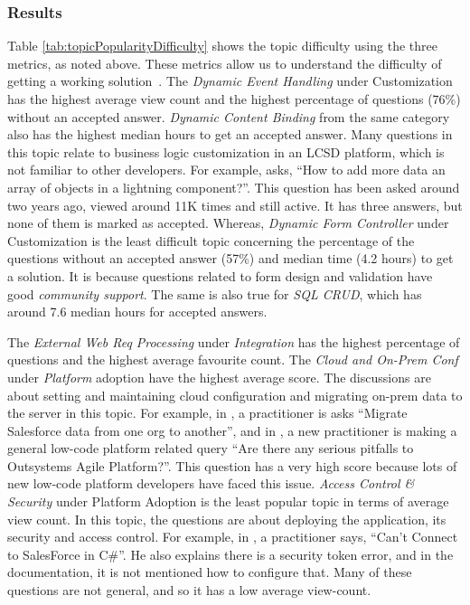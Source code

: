 \subsubsection{Results}
Table \ref{tab:topicPopularityDifficulty} shows the topic difficulty using the three metrics, as noted above. 
These metrics allow us to understand the difficulty of getting a working solution~\cite{bagherzadeh2019going, abdellatif2020challenges}.
The \textit{Dynamic Event Handling} under Customization has the highest average view count and the highest percentage of questions (76\%) without an accepted answer. \textit{Dynamic Content Binding} from the same category also has the highest median hours to get an accepted answer. Many questions in this topic relate to business logic customization in an LCSD platform, which is not familiar to other developers. For example,  asks, ``How to add more data an array of objects in a lightning component?''. This question has been asked around two years ago, viewed around 11K times and still active. It has three answers, but none of them is marked as accepted. Whereas, \textit{Dynamic Form Controller} under Customization is the least difficult topic concerning the percentage of the questions without an accepted answer (57\%) and median time (4.2 hours) to get a solution. It is because questions related to form design and validation have good \textit{community support}. The same is also true for \textit{SQL CRUD}, which has around 7.6 median hours for accepted answers.

The \textit{External Web Req Processing} under
 \textit{Integration} has the highest percentage of questions and the highest average
favourite count. The \textit{Cloud and On-Prem Conf}
under  \textit{Platform} adoption have the highest average score. The
discussions are about setting and maintaining cloud configuration and migrating
on-prem data to the server in this topic. For example, in , a practitioner is
asks ``Migrate Salesforce data from one org to another'', and in , a
new practitioner is making a general low-code platform related query ``Are
there any serious pitfalls to Outsystems Agile Platform?''. This question has
a very high score because lots of new low-code platform developers have faced this
issue. \textit{Access Control \& Security} under Platform Adoption is the least
popular topic in terms of average view count. In this topic, the questions are about deploying the application, its security and access control. For example, in
, a practitioner says, ``Can't Connect to SalesForce in C\#''. He also
explains there is a security token error, and in the documentation, it is not
mentioned how to configure that. Many of these questions are not general, and
so it has a low average view-count.

